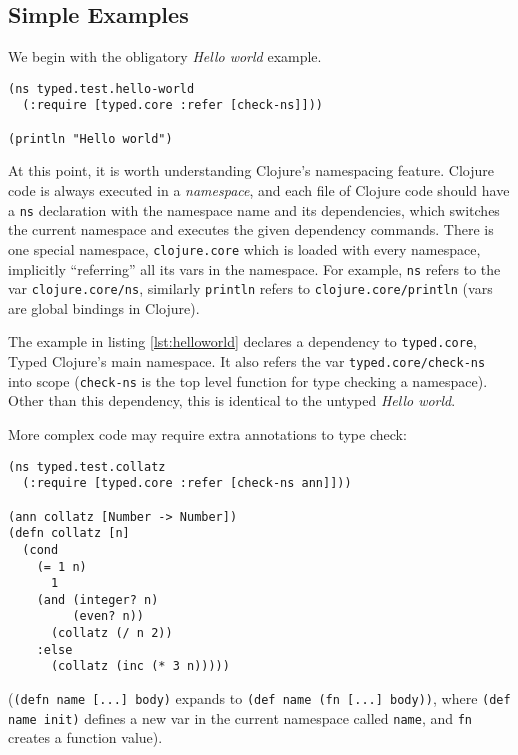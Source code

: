 \subsection{Simple Examples}

We begin with the obligatory \emph{Hello world} example.

\begin{lstlisting}[caption=Typed Hello world, label=lst:helloworld]
(ns typed.test.hello-world
  (:require [typed.core :refer [check-ns]]))

(println "Hello world")
\end{lstlisting}

At this point, it is worth understanding Clojure's namespacing feature.
Clojure code is always executed in a \emph{namespace}, and each file of Clojure code should 
have a \lstinline|ns| declaration with the namespace name and its dependencies,
which switches the current namespace and executes the given dependency commands.
There is one special namespace, \lstinline|clojure.core| which is
loaded with every namespace, implicitly ``referring'' all its vars in the namespace.
For example, \lstinline|ns| refers to the var \lstinline|clojure.core/ns|,
similarly \lstinline|println| refers to \lstinline|clojure.core/println|
(vars are global bindings in Clojure).

The example in listing \ref{lst:helloworld} declares a dependency to 
\lstinline|typed.core|, Typed Clojure's main namespace. It also refers the var \lstinline|typed.core/check-ns|
into scope (\lstinline|check-ns| is the top level function for type checking a namespace).
Other than this dependency, this is identical to the untyped \emph{Hello world}.

More complex code may require extra annotations to type check:

\begin{lstlisting}[caption=Annotating vars in Typed Clojure (adapted from a Typed Scheme/Racket example by Tobin-Hochstadt~\cite{Tob10})]
(ns typed.test.collatz
  (:require [typed.core :refer [check-ns ann]]))

(ann collatz [Number -> Number])
(defn collatz [n]
  (cond
    (= 1 n) 
      1
    (and (integer? n) 
         (even? n)) 
      (collatz (/ n 2))
    :else 
      (collatz (inc (* 3 n)))))
\end{lstlisting}

(\lstinline|(defn name [...] body)| expands to \lstinline|(def name (fn [...] body))|,
where \lstinline|(def name init)| defines a new var in the current namespace 
called \lstinline|name|, and \lstinline|fn| creates a function value).

